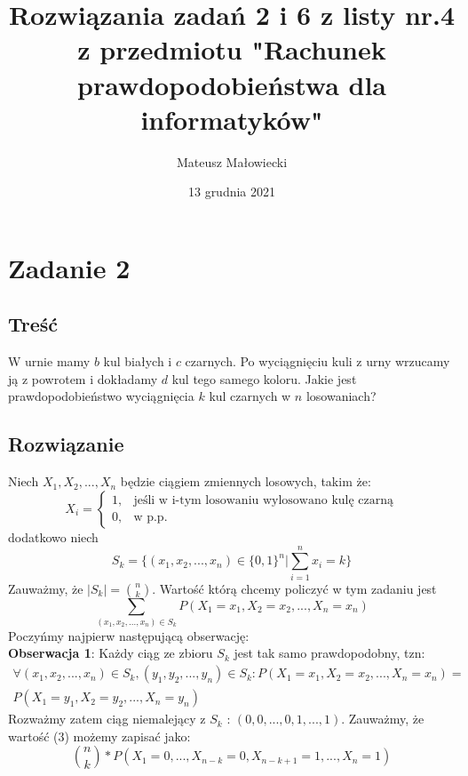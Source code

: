 \documentclass[10pt, a4paper]{article}
\title{Rozwiązania zadań 2 i 6 z listy nr.4 z przedmiotu "Rachunek prawdopodobieństwa dla informatyków"}
\date{13 grudnia 2021}
\author{Mateusz Małowiecki}
\begin{document}
\maketitle
\section*{Zadanie 2}
\subsection*{Treść}
 W urnie mamy $b$ kul białych i $c$ czarnych. Po wyciągnięciu kuli z urny wrzucamy ją z powrotem i dokładamy $d$ kul tego samego koloru. Jakie jest prawdopodobieństwo wyciągnięcia $k$ kul czarnych w $n$ losowaniach?
\subsection*{Rozwiązanie}
Niech $X_1, X_2, ..., X_n$ będzie ciągiem zmiennych losowych, takim że:
\begin{equation}
 X_i = 
 \begin{cases}
        1, & \text{jeśli w i-tym losowaniu wylosowano kulę czarną} \\
        0, & \text{w p.p.}
  \end{cases}
\end{equation} 
dodatkowo niech 
\begin{equation}
S_k = \Big\{(x_1, x_2, ..., x_n) \in \{0, 1\}^n \Big| \sum_{i=1}^n x_i = k\Big\}
\end{equation}
Zauważmy, że $|S_k| = {n \choose k}$. Wartość którą chcemy policzyć w tym zadaniu jest
\begin{equation}
\sum_{(x_1, x_2, ..., x_n) \in S_k} P(X_1 = x_1, X_2 = x_2, ..., X_n = x_n)
\end{equation}
Poczyńmy najpierw następującą obserwację: \\
\textbf{Obserwacja 1}: Każdy ciąg ze zbioru $S_k$ jest tak samo prawdopodobny, tzn:
\begin{align*}
\forall(x_1, x_2, ..., x_n) \in S_k, (y_1, y_2, ..., y_n) \in S_k:  P(X_1 = x_1, X_2 = x_2, ..., X_n = x_n) = \\ P(X_1 = y_1, X_2 = y_2, ..., X_n = y_n)
\end{align*}
Rozważmy zatem ciąg niemalejący z $S_k$ : $(0, 0, ..., 0, 1, ..., 1)$. Zauważmy, że wartość (3) możemy zapisać jako:
\begin{equation}
{n \choose k} * P(X_1=0, ..., X_{n-k} = 0, X_{n-k+1} = 1, ..., X_n=1)
\end{equation}
\end{document}
